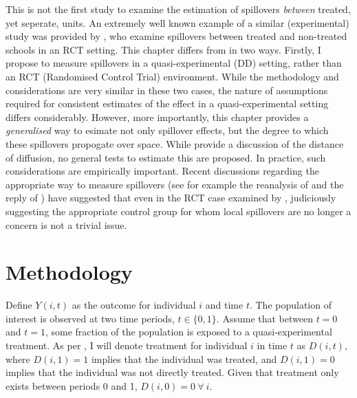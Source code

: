 This is not the first study to examine the estimation of spillovers 
\emph{between} treated, yet seperate, units.  An extremely well known example
of a similar (experimental) study was provided by \citet{MiguelKremer2004}, who
examine spillovers between treated and non-treated schools in an RCT setting.  
This chapter differs from \citet{MiguelKremer2004} in two ways.  Firstly, I 
propose to measure spillovers in a quasi-experimental (DD) setting, rather than 
an RCT (Randomised Control Trial) environment.  While the methodology and 
considerations are very similar in these two cases, the nature of assumptions 
required for consistent estimates of the effect in a quasi-experimental setting 
differs considerably.  However, more importantly, this chapter provides a 
\emph{generalised} way to esimate not only spillover effects, but the degree to
which these spillovers propogate over space.  While \citet{MiguelKremer2004} 
provide a discussion of the distance of diffusion, no general tests to estimate 
this are proposed.  In practice, such considerations are empirically important. 
Recent discussions regarding the appropriate way to measure spillovers (see for 
example the reanalysis of \citet{Daveyetal2015} and the reply of 
\citet{Hicksetal2015}) have suggested that even in the RCT case examined by 
\citet{MiguelKremer2004}, judiciously suggesting the appropriate control group 
for whom local spillovers are no longer a concern is not a trivial issue. 

\nocite{AngelucciDeGiorgi2009} \nocite{Heckmanetal1998}
 \nocite{Heckmanetal1998b}

\section{Methodology}
Define $Y(i,t)$ as the outcome for individual $i$ and time $t$.  The population
of interest is observed at two time periods, $t\in \{0,1\}$. Assume that between
$t=0$ and $t=1$, some fraction of the population is exposed to a 
quasi-experimental treatment.  As per \citet{Abadie2005}, I will denote 
treatment for individual $i$ in time $t$ as $D(i,t)$, where $D(i,1)=1$ implies 
that the individual was treated, and $D(i,1)=0$ implies that the individual was
not directly treated.  Given that treatment only exists between periods 0 and 1,
$D(i,0)=0\ \forall\ i$.

